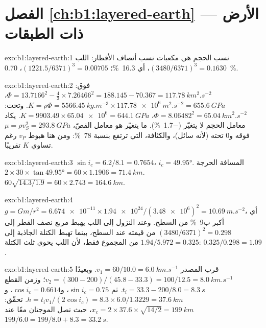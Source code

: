 \section*{الفصل \ref{ch:b1:layered-earth} --- الأرض ذات الطبقات}

\begin{solution}{exo:b1:layered-earth:1}
نسب الحجم هي مكعبات نسب أنصاف الأقطار: اللب
$(3480/6371)^3 = 0.1630$، أي \qty{16.3}{\percent}؛ 
$(1221.5/6371)^3 = 0.00705$، \qty{0.70}{\percent}.
\end{solution}

\begin{solution}{exo:b1:layered-earth:2}
فوق: $\Phi = 13.7166^2 - \tfrac43\times7.26466^2 = 188.145 - 70.367 =
\qty{117.78}{km^2.s^{-2}}$، $K = \rho\Phi = \qty{5566.45}{kg.m^{-3}}\times
\qty{117.78e6}{m^2.s^{-2}} = \qty{655.6}{GPa}$. وتحت: $\Phi = 8.06482^2 =
\qty{65.04}{km^2.s^{-2}}$، $K = 9903.49\times\num{65.04e6} = \qty{644.1}{GPa}$.
يكاد معامل الحجم لا يتغيّر (\qty{-1.7}{\percent}). ما يتغيّر هو معامل القصّ، $\mu = \rho v_S^2 = \qty{293.8}{GPa}$ فوقه و$0$ تحته (لأنه سائل)، والكثافة، التي ترتفع بنسبة \qty{78}{\percent}: ومن هنا هبوط
$v_P$ رغم تساوي $K$ تقريبًا.
\end{solution}

\begin{solution}{exo:b1:layered-earth:3}
$\sin i_c = 6.2/8.1 = 0.7654$، $i_c = \ang{49.95}$. المسافة الحرجة
$2\times30\times\tan\ang{49.95} = 60\times1.1906 = \qty{71.4}{km}$. 
$60\sqrt{14.3/1.9} = 60\times2.743 = \qty{164.6}{km}$.
\end{solution}

\begin{solution}{exo:b1:layered-earth:4}
$g = Gm/r^2 = \num{6.674e-11}\times\num{1.94e24}/(\num{3.48e6})^2 =
\qty{10.69}{m.s^{-2}}$، أي أكبر ب\qty{9}{\percent} من السطح. وعند النزول إلى اللب يهبط مربع نصف القطر إلى $(3480/6371)^2 = 0.298$ من قيمته عند السطح، بينما تهبط الكتلة الجاذبة إلى $1.94/5.972 = 0.325$ من المجموع فقط، لأن اللب يحوي ثلث الكتلة: $0.325/0.298 = 1.09$.
\end{solution}

\begin{solution}{exo:b1:layered-earth:5}
قرب المصدر $v_1 = 60/10.0 = \qty{6.0}{km.s^{-1}}$. وبعيدًا
$v_2 = (300 - 200)/(45.8 - 33.3) = 100/12.5 = \qty{8.0}{km.s^{-1}}$؛ وزمن القطع
$t_i = 33.3 - 200/8.0 = \qty{8.3}{s}$. ثم $\sin i_c =
0.75$، و$\cos i_c = 0.6614$، و$h = t_i v_1/(2\cos i_c) = 8.3\times6.0/1.3229
= \qty{37.6}{km}$. تحقّق: $x_c = 2\times37.6\times\sqrt{14/2} = \qty{199}{km}$،
حيث تصل الموجتان معًا عند $199/6.0 = 199/8.0 + 8.3 = \qty{33.2}{s}$.
\end{solution}

